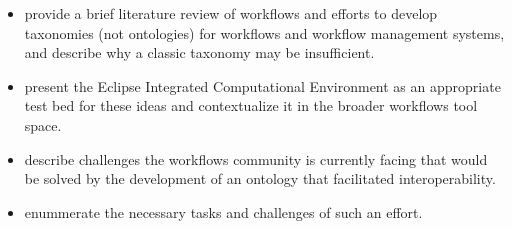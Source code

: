 \begin{itemize}
\itemsep1pt\parskip0pt
\item
  provide a brief literature review of workflows and efforts to develop
  taxonomies (not ontologies) for workflows and workflow management
  systems, and describe why a classic taxonomy may be insufficient.
\item
  present the Eclipse Integrated Computational Environment as an
  appropriate test bed for these ideas and contextualize it in the
  broader workflows tool space.
\item
  describe challenges the workflows community is currently facing that
  would be solved by the development of an ontology that facilitated
  interoperability.
\item
  enummerate the necessary tasks and challenges of such an effort.
\end{itemize}